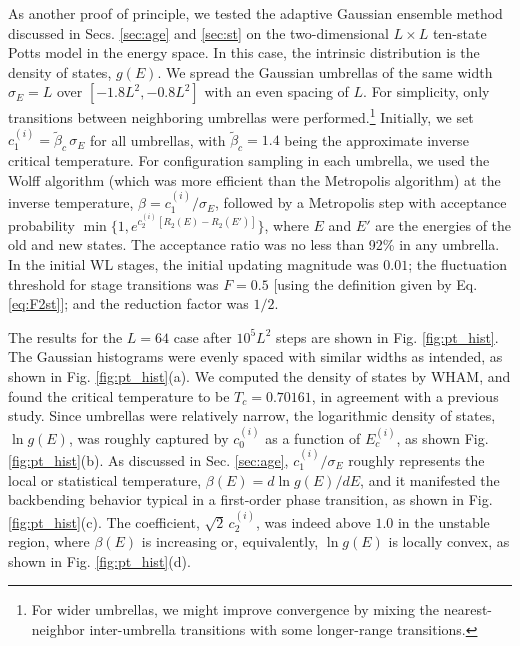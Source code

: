 \documentclass[reprint, superscriptaddress, floatfix]{revtex4-1}
\newcommand{\note}[1]{{\color{DarkGreen}\footnotesize \textsc{Note.} #1}}
\begin{document}
As another proof of principle,
we tested the adaptive Gaussian ensemble method
discussed in Secs. \ref{sec:age} and \ref{sec:st}
on the two-dimensional $L\times L$ ten-state
Potts model\cite{wu1982, newman, wang2001, wang2001pre}
in the energy space.
%
In this case, %
the intrinsic distribution is
the density of states, $g(E)$.
%
We spread the Gaussian umbrellas
of the same width $\sigma_E = L$ over $[-1.8L^2, -0.8L^2]$
with an even spacing of $L$.
%
For simplicity, only transitions between neighboring
umbrellas were performed.\footnote{For
  wider umbrellas, we might improve convergence
  by mixing the nearest-neighbor inter-umbrella transitions
  with some longer-range transitions.}
%
%
Initially, we set
$c_1^{(i)} = \tilde \beta_c \, \sigma_E$
for all umbrellas,
with $\tilde \beta_c = 1.4$
being the approximate inverse critical temperature.
%
For configuration sampling in each umbrella,
we used the Wolff algorithm\cite{wolff1989, newman}
(which was more efficient than the Metropolis algorithm)
at the inverse temperature, $\beta = c_1^{(i)}/\sigma_E$,
followed by a Metropolis step with
acceptance probability
$\min\bigl\{1, e^{c_2^{(i)} [R_2(E) - R_2(E')]} \bigr\}$,
where $E$ and $E'$ are the energies of the old and new states.
%
The acceptance ratio was no less than 92\% in any umbrella.
%
In the initial WL stages,
the initial updating magnitude was $0.01$;
the fluctuation threshold for stage transitions
was $F = 0.5$ [using the definition given by Eq. \eqref{eq:F2st}];
and the reduction factor was $1/2$.

The results for the $L = 64$ case
after $10^5 L^2$ steps are shown
in Fig. \ref{fig:pt_hist}.
%
The Gaussian histograms were evenly spaced with similar widths as intended,
as shown in Fig. \ref{fig:pt_hist}(a).
%
We computed the density of states by WHAM,
and found the critical temperature to be $T_c = 0.70161$,
in agreement with a previous study\cite{wang2001pre}.
%
Since umbrellas were relatively narrow,
the logarithmic density of states, $\ln g(E)$,
was roughly captured
by $c_0^{(i)}$ as a function of $E_c^{(i)}$,
as shown Fig. \ref{fig:pt_hist}(b).
%
As discussed in Sec. \ref{sec:age},
$c_1^{(i)}/\sigma_E$ roughly represents
the local or statistical temperature, $\beta(E) = d\ln g(E)/dE$,
and it manifested
the backbending behavior\cite{kim2006, *kim2007, kim2010}
typical in a first-order phase transition,
as shown in Fig. \ref{fig:pt_hist}(c).
%
The coefficient, $\sqrt 2 \, c_2^{(i)}$,
was indeed above $1.0$
in the unstable region,
where $\beta(E)$ is increasing or, equivalently,
$\ln g(E)$ is locally convex,
as shown in Fig. \ref{fig:pt_hist}(d).
\end{document}
